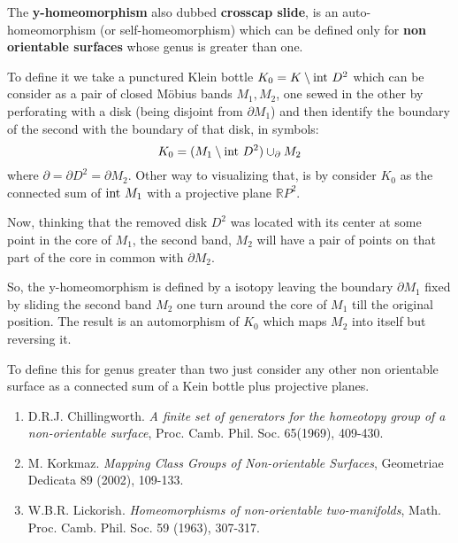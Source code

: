 \documentclass[12pt]{article}
\begin{document}
The {\bf y-homeomorphism} also dubbed {\bf crosscap slide}, is an auto-homeomorphism (or self-homeomorphism) which can be defined only for 
{\bf non orientable surfaces} whose genus is greater than one. 

To define it we take a punctured Klein bottle $K_0=K\setminus{\rm int}\ D^2$ which can be consider as a pair of closed M\"obius bands $M_1,M_2$, one sewed in the other by perforating with a disk (being disjoint from $\partial M_1$) and then identify the boundary of the second with the boundary of that disk, in symbols:
$$ K_0=(M_1\setminus{\rm int}\ D^2)\cup_{\partial}M_2$$
where $\partial =\partial D^2=\partial M_2$. Other way to visualizing that, is by consider $K_0$ as the connected sum of ${\rm int}\ M_1$ with a 
projective plane ${\mathbb{R}}P^2$.

Now, thinking that the removed disk $D^2$ was located with its center at some point in the core of $M_1$, the second band, $M_2$ will have a pair  of points on that  part of the core in common with $\partial M_2$.

So, the  y-homeomorphism is defined by a isotopy  leaving the boundary $\partial M_1$ fixed by sliding the second band  $M_2$ one turn around the 
core of $M_1$ till the original position. The result is an automorphism of $K_0$ which maps $M_2$ into itself but reversing it.

To define this for genus greater than two just consider any other non orientable surface as a connected sum of a Kein bottle plus projective planes.

\begin{enumerate}
\item D.R.J. Chillingworth. {\it A finite set of generators for the 
ho\-meo\-to\-py group of a non-orientable surface}, Proc. Camb. Phil. Soc. 
65(1969), 409-430.

\item M. Korkmaz. {\it Mapping Class Groups of Non-orientable Surfaces}, Geometriae Dedicata 89 (2002), 109-133.

\item W.B.R. Lickorish. {\it Homeomorphisms of non-orientable two-manifolds}, 
Math. Proc. Camb. Phil. Soc. 59 (1963), 307-317.

\end{enumerate}
\end{document}
